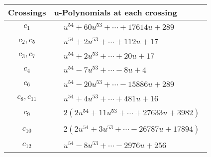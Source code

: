 \documentclass[1p]{elsarticle_modified}
\theoremstyle{definition}
\begin{document}
\begin{tabular}{m{50pt}|m{274pt}}
Crossings & \hspace{64pt}u-Polynomials at each crossing \\
\hline $$\begin{aligned}c_{1}\end{aligned}$$&$\begin{aligned}
&u^{54}+60 u^{53}+\cdots+17614 u+289
\end{aligned}$\\
\hline $$\begin{aligned}c_{2},c_{5}\end{aligned}$$&$\begin{aligned}
&u^{54}+2 u^{53}+\cdots+112 u+17
\end{aligned}$\\
\hline $$\begin{aligned}c_{3},c_{7}\end{aligned}$$&$\begin{aligned}
&u^{54}+2 u^{53}+\cdots+20 u+17
\end{aligned}$\\
\hline $$\begin{aligned}c_{4}\end{aligned}$$&$\begin{aligned}
&u^{54}-7 u^{53}+\cdots-8 u+4
\end{aligned}$\\
\hline $$\begin{aligned}c_{6}\end{aligned}$$&$\begin{aligned}
&u^{54}-20 u^{53}+\cdots-15886 u+289
\end{aligned}$\\
\hline $$\begin{aligned}c_{8},c_{11}\end{aligned}$$&$\begin{aligned}
&u^{54}+4 u^{53}+\cdots+481 u+16
\end{aligned}$\\
\hline $$\begin{aligned}c_{9}\end{aligned}$$&$\begin{aligned}
&2(2 u^{54}+11 u^{53}+\cdots+27633 u+3982)
\end{aligned}$\\
\hline $$\begin{aligned}c_{10}\end{aligned}$$&$\begin{aligned}
&2(2 u^{54}+3 u^{53}+\cdots-26787 u+17894)
\end{aligned}$\\
\hline $$\begin{aligned}c_{12}\end{aligned}$$&$\begin{aligned}
&u^{54}-8 u^{53}+\cdots-2976 u+256
\end{aligned}$\\
\hline
\end{tabular}\\~\\
\end{document}
